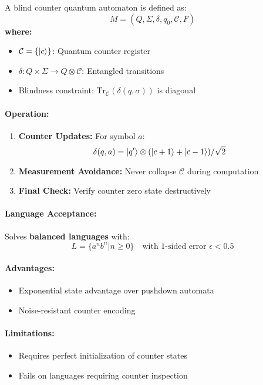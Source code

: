 \begin{definition}
A blind counter quantum automaton is defined as:
\[
M = (Q, \Sigma, \delta, q_0, \mathcal{C}, F)
\]
\textbf{where:}
\begin{itemize}
    \item $\mathcal{C} = \{\ket{c}\}$: Quantum counter register
    \item $\delta: Q \times \Sigma \rightarrow Q \otimes \mathcal{C}$: Entangled transitions
    \item Blindness constraint: $\text{Tr}_\mathcal{C}(\delta(q,\sigma))$ is diagonal
\end{itemize}
\end{definition}

\paragraph{Operation:}
\begin{enumerate}
    \item \textbf{Counter Updates:} For symbol $a$:
    \[
    \delta(q,a) = \ket{q'} \otimes (\ket{c+1} + \ket{c-1})/\sqrt{2}
    \]
    \item \textbf{Measurement Avoidance:} Never collapse $\mathcal{C}$ during computation
    \item \textbf{Final Check:} Verify counter zero state destructively
\end{enumerate}

\paragraph{Language Acceptance:}
Solves \textbf{balanced languages} with:
\[
L = \{a^nb^n | n \geq 0\} \quad \text{with 1-sided error } \epsilon < 0.5 
\]
\cite{ambainis1998one}

\paragraph{Advantages:}
\begin{itemize}
    \item Exponential state advantage over pushdown automata
    \item Noise-resistant counter encoding
\end{itemize}

\paragraph{Limitations:}
\begin{itemize}
    \item Requires perfect initialization of counter states
    \item Fails on languages requiring counter inspection
\end{itemize}


